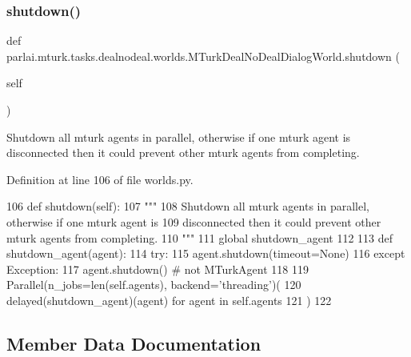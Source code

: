 \subsubsection{\texorpdfstring{shutdown()}{shutdown()}}
{\footnotesize\ttfamily def parlai.\+mturk.\+tasks.\+dealnodeal.\+worlds.\+M\+Turk\+Deal\+No\+Deal\+Dialog\+World.\+shutdown (\begin{DoxyParamCaption}\item[{}]{self }\end{DoxyParamCaption})}

\begin{DoxyVerb}Shutdown all mturk agents in parallel, otherwise if one mturk agent is
disconnected then it could prevent other mturk agents from completing.
\end{DoxyVerb}
 

Definition at line 106 of file worlds.\+py.


\begin{DoxyCode}
106     \textcolor{keyword}{def }shutdown(self):
107         \textcolor{stringliteral}{"""}
108 \textcolor{stringliteral}{        Shutdown all mturk agents in parallel, otherwise if one mturk agent is}
109 \textcolor{stringliteral}{        disconnected then it could prevent other mturk agents from completing.}
110 \textcolor{stringliteral}{        """}
111         \textcolor{keyword}{global} shutdown\_agent
112 
113         \textcolor{keyword}{def }shutdown\_agent(agent):
114             \textcolor{keywordflow}{try}:
115                 agent.shutdown(timeout=\textcolor{keywordtype}{None})
116             \textcolor{keywordflow}{except} Exception:
117                 agent.shutdown()  \textcolor{comment}{# not MTurkAgent}
118 
119         Parallel(n\_jobs=len(self.agents), backend=\textcolor{stringliteral}{'threading'})(
120             delayed(shutdown\_agent)(agent) \textcolor{keywordflow}{for} agent \textcolor{keywordflow}{in} self.agents
121         )
122 \end{DoxyCode}


\subsection{Member Data Documentation}
\mbox{\label{classparlai_1_1mturk_1_1tasks_1_1dealnodeal_1_1worlds_1_1MTurkDealNoDealDialogWorld_a13200c06840e4af9142e7ae618d8aadb}} 
